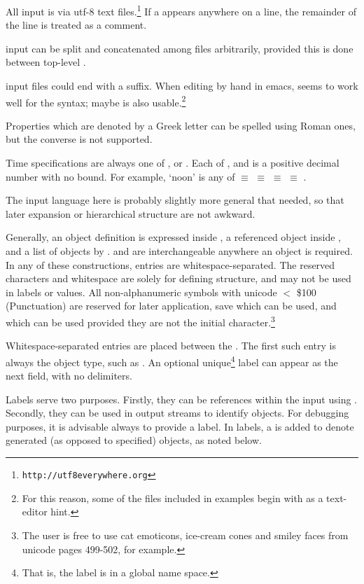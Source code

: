 All input is via utf-8 text files.\footnote{\texttt{http://utf8everywhere.org}} If a \inp{\#} appears anywhere on a line,
the remainder of the line is treated as a comment.

 input can be split and concatenated among files
arbitrarily, provided this is done between top-level .

 input files could end with a  suffix. When
editing by hand in emacs,  seems to work well for the
syntax; maybe  is also usable.\footnote{For this reason,
some of the  files included in examples begin
with  as a text-editor hint.}

Properties which are denoted by a Greek letter can be spelled using Roman
ones, but the converse is not supported.

Time specifications are always one of
,
 or
.
Each of ,  and  is a positive decimal number with no bound.  For example, `noon' is any of
 $\equiv$  $\equiv$  $\equiv$
 $\equiv$ .

The input language here is probably slightly more general that needed,
so that later expansion or hierarchical structure are not awkward.

Generally, an object definition is expressed inside \inp{[\dots]}, a
referenced object inside \inp{<\dots>}, and a list of objects by
\inp{\{\dots\}}. \inp{[\dots]} and \inp{<\dots>} are interchangeable
anywhere an object is required.
In any of these constructions, entries are whitespace-separated.  The
reserved characters \inp{\{\ \} [ ] < > = } and whitespace are solely
for defining structure, and may not be used in labels or values.
All non-alphanumeric symbols with unicode $<$ \$100 (Punctuation) are
reserved for later application, save \inp{\_} which can be
used, and  which can be used provided they are not the initial
character.\footnote{The user is free to use cat emoticons, ice-cream cones
  and smiley faces from unicode pages 499-502, for example.}

Whitespace-separated entries are placed between the \inp{[\dots]}.
The first such entry is always the object type, such as .
An optional unique\footnote{That is, the label is in a global name
  space.}  label can appear as the next field, with no
delimiters.

Labels serve two purposes. Firstly, they can be references within the
input using \inp{<\dots>}.  Secondly, they can be used in output streams
to identify objects.  For debugging purposes, it is advisable always
to provide a label.  In labels, a \inp{/} is added to denote generated
(as opposed to specified) objects, as noted below.

